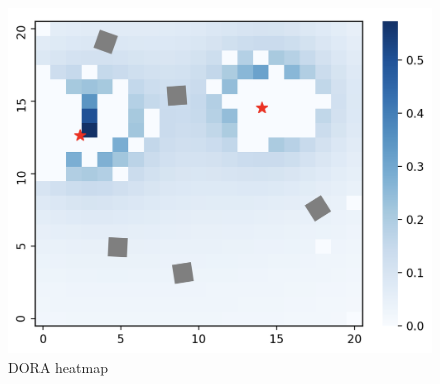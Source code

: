 \begin{figure}
    \includegraphics[width=16cm]{figures/dora_explorer/heatmap_dora.png}
    \caption{\ac{DORA} heatmap}
    \label{results:beliefdora}
\end{figure}


